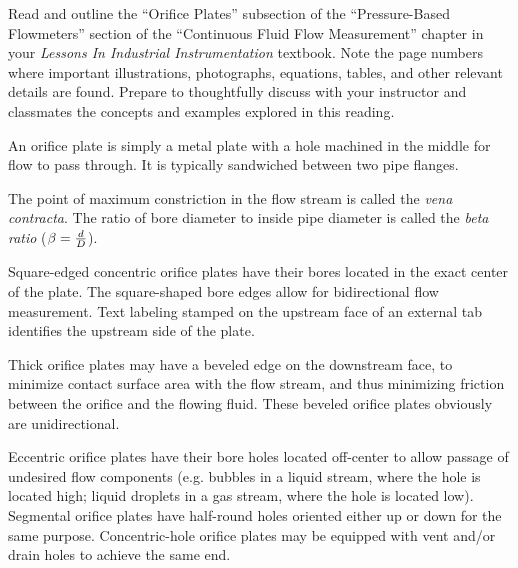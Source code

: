 

Read and outline the ``Orifice Plates'' subsection of the ``Pressure-Based Flowmeters'' section of the ``Continuous Fluid Flow Measurement'' chapter in your {\it Lessons In Industrial Instrumentation} textbook.  Note the page numbers where important illustrations, photographs, equations, tables, and other relevant details are found.  Prepare to thoughtfully discuss with your instructor and classmates the concepts and examples explored in this reading.














An orifice plate is simply a metal plate with a hole machined in the middle for flow to pass through.  It is typically sandwiched between two pipe flanges.

\vskip 10pt

The point of maximum constriction in the flow stream is called the {\it vena contracta}.  The ratio of bore diameter to inside pipe diameter is called the {\it beta ratio} ($\beta = {d \over D}$).

\vskip 10pt

Square-edged concentric orifice plates have their bores located in the exact center of the plate.  The square-shaped bore edges allow for bidirectional flow measurement.  Text labeling stamped on the upstream face of an external tab identifies the upstream side of the plate.

\vskip 10pt

Thick orifice plates may have a beveled edge on the downstream face, to minimize contact surface area with the flow stream, and thus minimizing friction between the orifice and the flowing fluid.  These beveled orifice plates obviously are unidirectional.

\vskip 10pt

Eccentric orifice plates have their bore holes located off-center to allow passage of undesired flow components (e.g. bubbles in a liquid stream, where the hole is located high; liquid droplets in a gas stream, where the hole is located low).  Segmental orifice plates have half-round holes oriented either up or down for the same purpose.  Concentric-hole orifice plates may be equipped with vent and/or drain holes to achieve the same end.


